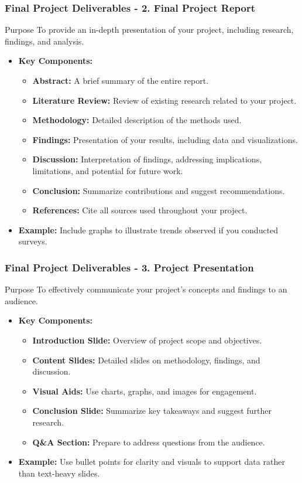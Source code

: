 \documentclass[aspectratio=169]{beamer}
\begin{document}
\begin{frame}[fragile]
  \frametitle{Final Project Deliverables - 2. Final Project Report}
  \begin{block}{Purpose}
    To provide an in-depth presentation of your project, including research, findings, and analysis.
  \end{block}
  \begin{itemize}
    \item \textbf{Key Components:}
      \begin{itemize}
        \item \textbf{Abstract:} A brief summary of the entire report.
        \item \textbf{Literature Review:} Review of existing research related to your project.
        \item \textbf{Methodology:} Detailed description of the methods used.
        \item \textbf{Findings:} Presentation of your results, including data and visualizations.
        \item \textbf{Discussion:} Interpretation of findings, addressing implications, limitations, and potential for future work.
        \item \textbf{Conclusion:} Summarize contributions and suggest recommendations.
        \item \textbf{References:} Cite all sources used throughout your project.
      \end{itemize}
    \item \textbf{Example:} Include graphs to illustrate trends observed if you conducted surveys.
  \end{itemize}
\end{frame}

\begin{frame}[fragile]
  \frametitle{Final Project Deliverables - 3. Project Presentation}
  \begin{block}{Purpose}
    To effectively communicate your project's concepts and findings to an audience.
  \end{block}
  \begin{itemize}
    \item \textbf{Key Components:}
      \begin{itemize}
        \item \textbf{Introduction Slide:} Overview of project scope and objectives.
        \item \textbf{Content Slides:} Detailed slides on methodology, findings, and discussion.
        \item \textbf{Visual Aids:} Use charts, graphs, and images for engagement.
        \item \textbf{Conclusion Slide:} Summarize key takeaways and suggest further research.
        \item \textbf{Q\&A Section:} Prepare to address questions from the audience.
      \end{itemize}
    \item \textbf{Example:} Use bullet points for clarity and visuals to support data rather than text-heavy slides.
  \end{itemize}
\end{frame}
\end{document}
